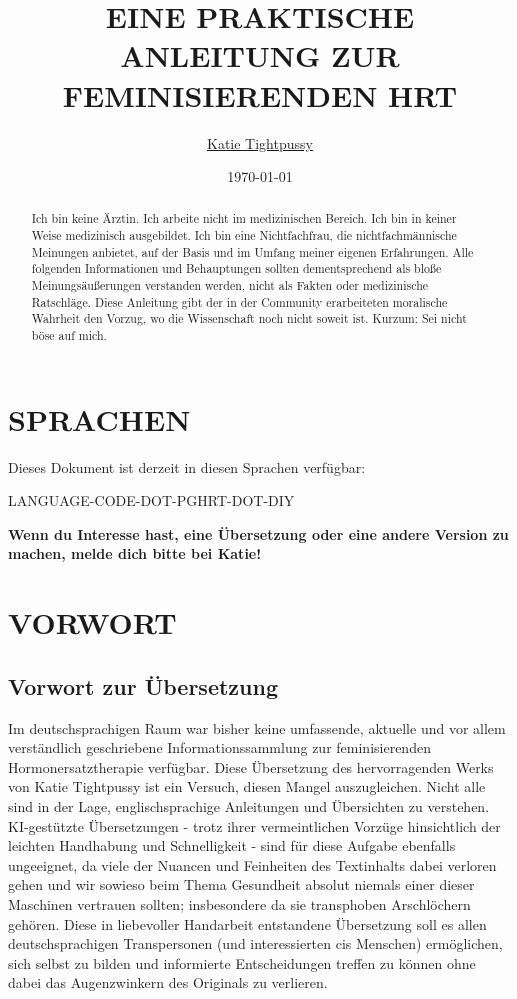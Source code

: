 \documentclass{article}
\title{EINE PRAKTISCHE ANLEITUNG ZUR FEMINISIERENDEN HRT}
\author{\href{https://katea.gay/}{Katie Tightpussy}}
\date{\today}
\begin{document}
\maketitle
\tableofcontents

\begin{abstract}
  Ich bin keine Ärztin. Ich arbeite nicht im medizinischen Bereich. Ich bin in keiner Weise medizinisch ausgebildet. Ich bin eine Nichtfachfrau, die nichtfachmännische Meinungen anbietet, auf der Basis und im Umfang meiner eigenen Erfahrungen. Alle folgenden Informationen und Behauptungen sollten dementsprechend als bloße Meinungsäußerungen verstanden werden, nicht als Fakten oder medizinische Ratschläge. Diese Anleitung gibt der in der Community erarbeiteten moralische Wahrheit den Vorzug, wo die Wissenschaft noch nicht soweit ist. Kurzum: Sei nicht böse auf mich.
\end{abstract}


\section*{SPRACHEN}

Dieses Dokument ist derzeit in diesen Sprachen verfügbar:

LANGUAGE-CODE-DOT-PGHRT-DOT-DIY

\noindent\textbf{Wenn du Interesse hast, eine Übersetzung oder eine andere Version zu machen, melde dich bitte bei Katie!}



\section{VORWORT}

\subsection*{Vorwort zur Übersetzung}

Im deutschsprachigen Raum war bisher keine umfassende, aktuelle und vor allem verständlich geschriebene Informationssammlung zur feminisierenden Hormonersatztherapie verfügbar. Diese Übersetzung des hervorragenden Werks von Katie Tightpussy ist ein Versuch, diesen Mangel auszugleichen. Nicht alle sind in der Lage, englischsprachige Anleitungen und Übersichten zu verstehen. KI-gestützte Übersetzungen - trotz ihrer vermeintlichen Vorzüge hinsichtlich der leichten Handhabung und Schnelligkeit - sind für diese Aufgabe ebenfalls ungeeignet, da viele der Nuancen und Feinheiten des Textinhalts dabei verloren gehen und wir sowieso beim Thema Gesundheit absolut niemals einer dieser Maschinen vertrauen sollten; insbesondere da sie transphoben Arschlöchern gehören. Diese in liebevoller Handarbeit entstandene Übersetzung soll es allen deutschsprachigen Transpersonen (und  interessierten cis Menschen) ermöglichen, sich selbst zu bilden und informierte Entscheidungen treffen zu können ohne dabei das Augenzwinkern des Originals zu verlieren.
\end{document}
